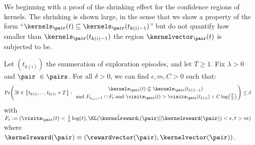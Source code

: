 \documentclass[preprint,cleveref,12pt]{colt2025}
\DeclarePairedDelimiter{\braces}{\{}{\}}	%
\DeclarePairedDelimiter{\parens}{(}{)}	%
\def\kernel{\kernelvector}
\def\kerrew{\kernelreward}
\def\reward{\rewardvector}
\begin{document}
    We beginning with a proof of the shrinking effect for the confidence regions of kernels. 
    The shrinking is shown large, in the sense that we show a property of the form ``$\kernels_\pair(t) \subseteq \kernels_\pair (t_{k(i)-1})$'' but do not quantify how smaller than $\kernels_\pair (t_{k(i)-1})$ the region $\kernel_\pair(t)$ is subjected to be. 

    \begin{lemma}
        \label{lemma_shrinking_kernels}
        Let $(t_{k(i)})$ the enumeration of exploration episodes, and let $T \ge 1$.
        Fix $\lambda > 0$ and $\pair \in \pairs$.
        For all $\delta > 0$, we can find $\epsilon, m, C > 0$ such that:
        \begin{equation*}
            \Pr \parens*{
                \exists t \in \braces*{t_{k(i)}, \ldots t_{k(i)}+T}
                :
                {
                    \kernels_\pair(t) \not \subseteq \kernels_\pair(t_{k(i)-1}) 
                    \atop
                    \text{~and~}
                    F_{t_{k(i)}-1} \cap F_t \text{~and~}
                    \visits_\pair(t) > \visits_\pair(t_{k(i)}) + C \log\parens*{\tfrac T\delta}
                }
            }
            \le \delta
        \end{equation*}
        with $F_{t} := (\visits_\pair(t) < \frac 1\lambda \log(t), \KL(\hat{\kerrew}_t(\pair)||\kerrew(\pair)) < \epsilon, t > m)$ where $\kerrew(\pair) \equiv (\reward(\pair), \kernel(\pair))$. 
        
    \end{lemma}
\end{document}
